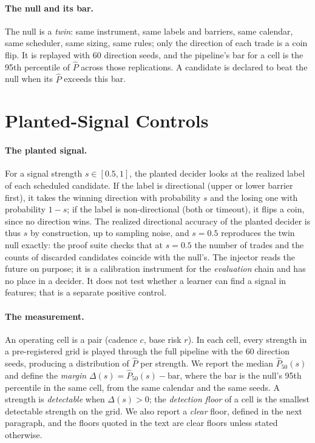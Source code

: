 \documentclass[11pt]{article}
\newcommand{\Pf}{\hat{P}}
\begin{document}
\paragraph{The null and its bar.}
The null is a \emph{twin}: same instrument, same labels and barriers, same calendar, same scheduler, same sizing, same rules; only the direction of each trade is a coin flip. It is replayed with 60 direction seeds, and the pipeline's bar for a cell is the 95th percentile of $\Pf$ across those replications. A candidate is declared to beat the null when its $\Pf$ exceeds this bar.

\section{Planted-Signal Controls}
\label{sec:method}

\paragraph{The planted signal.}
For a signal strength $s \in [0.5, 1]$, the planted decider looks at the realized label of each scheduled candidate. If the label is directional (upper or lower barrier first), it takes the winning direction with probability $s$ and the losing one with probability $1-s$; if the label is non-directional (both or timeout), it flips a coin, since no direction wins. The realized directional accuracy of the planted decider is thus $s$ by construction, up to sampling noise, and $s = 0.5$ reproduces the twin null exactly: the proof suite checks that at $s = 0.5$ the number of trades and the counts of discarded candidates coincide with the null's. The injector reads the future on purpose; it is a calibration instrument for the \emph{evaluation} chain and has no place in a decider. It does not test whether a learner can find a signal in features; that is a separate positive control.

\paragraph{The measurement.}
An operating cell is a pair (cadence $c$, base risk $r$). In each cell, every strength in a pre-registered grid is played through the full pipeline with the 60 direction seeds, producing a distribution of $\Pf$ per strength. We report the median $\Pf_{50}(s)$ and define the \emph{margin} $\Delta(s) = \Pf_{50}(s) - \text{bar}$, where the bar is the null's 95th percentile in the same cell, from the same calendar and the same seeds. A strength is \emph{detectable} when $\Delta(s) > 0$; the \emph{detection floor} of a cell is the smallest detectable strength on the grid. We also report a \emph{clear} floor, defined in the next paragraph, and the floors quoted in the text are clear floors unless stated otherwise.
\end{document}
